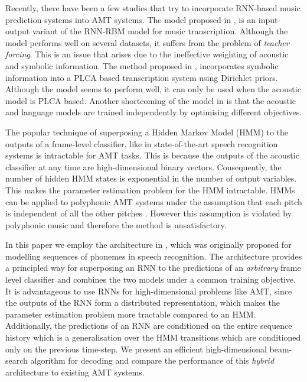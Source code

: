 \documentclass{article}
\begin{document}
Recently, there have been a few studies that try to incorporate RNN-based music prediction systems into AMT systems. The model proposed in \cite{boulanger2013high}, is an input-output variant of the RNN-RBM model for music transcription. Although the model performs well on several datasets, it suffers from the problem of \emph{teacher forcing}. This is an issue that arises due to the ineffective weighting of acoustic and symbolic information. The method proposed in \cite{sigtiarnn}, incorporates symbolic information into a PLCA based transcription system using Dirichlet priors. Although the model seems to perform well, it can only be used when the acoustic model is PLCA based. Another shortcoming of the model in \cite{sigtiarnn} is that the acoustic and language models are trained independently by optimising different objectives. 

The popular technique of superposing a Hidden Markov Model (HMM) to the outputs of a frame-level classifier, like in state-of-the-art speech recognition systems \cite{hinton2012deep} is intractable for AMT tasks. This is because the outputs of the acoustic classifier at any time are high-dimensional binary vectors. Consequently, the number of hidden HMM states is exponential in the number of output variables. This makes the parameter estimation problem for the HMM intractable. HMMs can be applied to polyphonic AMT systems under the assumption that each pitch is independent of all the other pitches \cite{poliner2006discriminative}. However this assumption is violated by polyphonic music and therefore the method is unsatisfactory. 

In this paper we employ the architecture in \cite{boulangerphone}, which was originally proposed for modelling sequences of phonemes in speech recognition. The architecture provides a principled way for superposing an RNN to the predictions of an \emph{arbitrary} frame level classifier and combines the two models under a common training objective. It is advantageous to use RNNs for high-dimensional problems like AMT, since the outputs of the RNN form a distributed representation, which makes the parameter estimation problem more tractable compared to an HMM. Additionally, the predictions of an RNN are conditioned on the entire sequence history which is a generalisation over the HMM transitions which are conditioned only on the previous time-step. We present an efficient high-dimensional beam-search algorithm for decoding and compare the performance of this \emph{hybrid} architecture to existing AMT systems.
\end{document}
